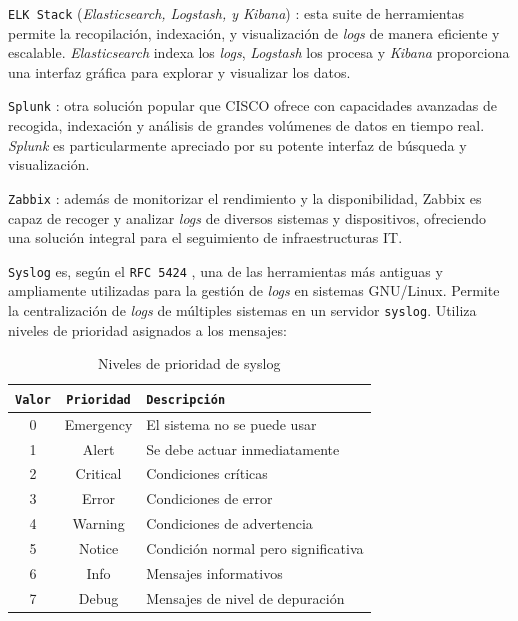 \texttt{\gls{ELK} Stack} (\textit{Elasticsearch, Logstash, y Kibana}) \cite{elastic-stack}: esta suite de herramientas permite la recopilación, indexación, y visualización de \textit{logs} de manera eficiente y escalable. \textit{Elasticsearch} indexa los \textit{logs}, \textit{Logstash} los procesa y \textit{Kibana} proporciona una interfaz gráfica para explorar y visualizar los datos.

\texttt{Splunk} \cite{splunk}: otra solución popular que CISCO \cite{cisco} ofrece con capacidades avanzadas de recogida, indexación y análisis de grandes volúmenes de datos en tiempo real. \textit{Splunk} es particularmente apreciado por su potente interfaz de búsqueda y visualización.

\texttt{Zabbix} \cite{zabbix}: además de monitorizar el rendimiento y la disponibilidad, Zabbix es capaz de recoger y analizar \textit{logs} de diversos sistemas y dispositivos, ofreciendo una solución integral para el seguimiento de infraestructuras \gls{IT}. 

\texttt{Syslog} es, según el \texttt{\gls{RFC} 5424} \cite{rfc5424} , una de las herramientas más antiguas y ampliamente utilizadas para la gestión de \textit{logs} en sistemas GNU/Linux. Permite la centralización de \textit{logs} de múltiples sistemas en un servidor \texttt{syslog}. Utiliza niveles de prioridad asignados a los mensajes:

\begin{table}[H]
\centering
\footnotesize
\begin{tabular}{|c|c|p{8.5cm}|}
\hline
\rowcolor{graylight}\texttt{Valor} & \texttt{Prioridad} & \texttt{Descripción} \\
\hline
0 & Emergency & El sistema no se puede usar \\
\hline
1 & Alert & Se debe actuar inmediatamente \\
\hline
2 & Critical & Condiciones críticas \\
\hline
3 & Error & Condiciones de error \\
\hline
4 & Warning & Condiciones de advertencia \\
\hline
5 & Notice & Condición normal pero significativa \\
\hline
6 & Info & Mensajes informativos \\
\hline
7 & Debug & Mensajes de nivel de depuración \\
\hline
\end{tabular}
\caption{Niveles de prioridad de syslog}
\label{tab:syslog_priority}
\end{table}

